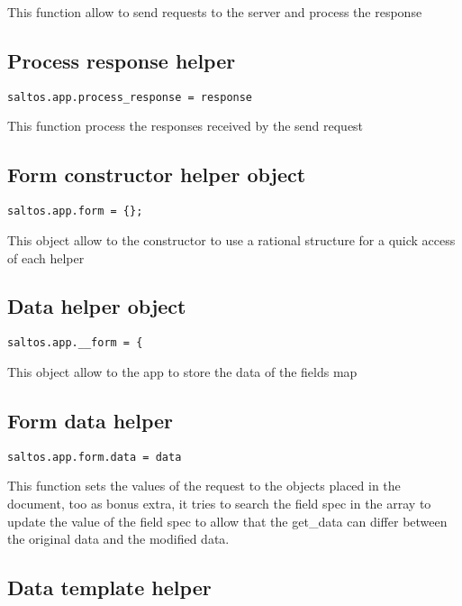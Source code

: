 \documentclass[a4paper]{book}
\begin{document}
This function allow to send requests to the server and process the response

\hypertarget{toc399}{}
\subsection{Process response helper}

\begin{lstlisting}
saltos.app.process_response = response
\end{lstlisting}

This function process the responses received by the send request

\hypertarget{toc400}{}
\subsection{Form constructor helper object}

\begin{lstlisting}
saltos.app.form = {};
\end{lstlisting}

This object allow to the constructor to use a rational structure for a quick access of each helper

\hypertarget{toc401}{}
\subsection{Data helper object}

\begin{lstlisting}
saltos.app.__form = {
\end{lstlisting}

This object allow to the app to store the data of the fields map

\hypertarget{toc402}{}
\subsection{Form data helper}

\begin{lstlisting}
saltos.app.form.data = data
\end{lstlisting}

This function sets the values of the request to the objects placed in the document, too as bonus
extra, it tries to search the field spec in the array to update the value of the field spec to
allow that the get\_data can differ between the original data and the modified data.

\hypertarget{toc403}{}
\subsection{Data template helper}
\end{document}
